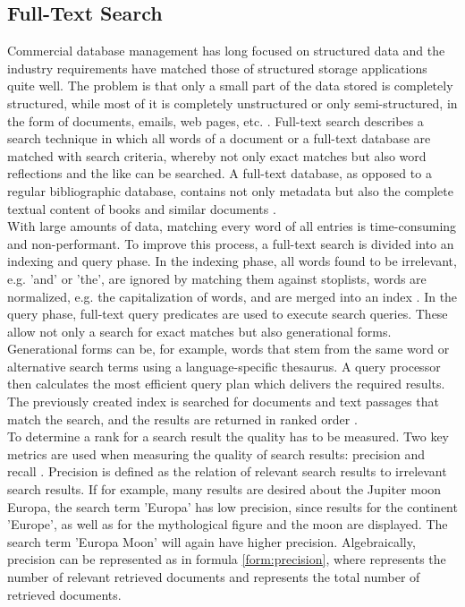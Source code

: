 \subsection{Full-Text Search}\label{sec:fulltext}
Commercial database management has long focused on structured data and the industry requirements have matched those of structured storage applications quite well.
The problem is that only a small part of the data stored is completely structured, while most of it is completely unstructured or only semi-structured, in the form of documents, emails, web pages, etc. \parencite[cf.][p. 7]{hamilton_microsoft_2001}. Full-text search describes a search technique in which all words of a document or a full-text database are matched with search criteria, whereby not only exact matches but also word reflections and the like can be searched. A full-text database, as opposed to a regular bibliographic database, contains not only metadata but also the complete textual content of books and similar documents \parencite[cf.][pp. 2-3]{tenopir_full_1990}.\\
With large amounts of data, matching every word of all entries is time-consuming and non-performant. To improve this process, a full-text search is divided into an indexing and query phase. In the indexing phase, all words found to be irrelevant, e.g. 'and' or 'the', are ignored by matching them against stoplists, words are normalized, e.g. the capitalization of words, and are merged into an index \parencite[cf.][p. 11]{coles_pro_2009}. In the query phase, full-text query predicates are used to execute search queries. These allow not only a search for exact matches but also generational forms. Generational forms can be, for example, words that stem from the same word or alternative search terms using a language-specific thesaurus. A query processor then calculates the most efficient query plan which delivers the required results. The previously created index is searched for documents and text passages that match the search, and the results are returned in ranked order \parencite[cf.][pp. 11-12]{coles_pro_2009}.\\
To determine a rank for a search result the quality has to be measured. Two key metrics are used when measuring the quality of search results: precision \symp and recall \symr.
Precision is defined as the relation of relevant search results to irrelevant search results. If for example, many results are desired about the Jupiter moon Europa, the search term 'Europa' has low precision, since results for the continent 'Europe', as well as for the mythological figure and the moon are displayed. The search term 'Europa Moon' will again have higher precision. Algebraically, precision can be represented as in formula \ref{form:precision}, where \symn represents the number of relevant retrieved documents and \symd represents the total number of retrieved documents.
